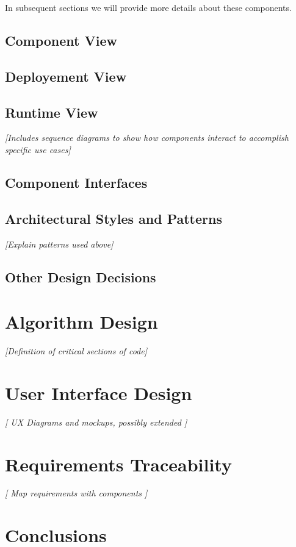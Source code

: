\documentclass[11pt]{article} %
\begin{document}
In subsequent sections we will provide more details about these components.

\subsection{Component View}

\subsection{Deployement View}

\subsection{Runtime View}
	\textit{ [Includes sequence diagrams to show how components interact to accomplish specific use cases]}

\subsection{Component Interfaces}

\subsection{Architectural Styles and Patterns}
	\textit{ [Explain patterns used above]}

\subsection{Other Design Decisions}


\newpage
\section{Algorithm Design}
	\textit{ [Definition of critical sections of code] }


\newpage
\section{User Interface Design}
	\textit{ [ UX Diagrams and mockups, possibly extended ] }


\newpage
\section{Requirements Traceability}
	\textit{[ Map requirements with components ]  }


\newpage
\section{Conclusions}
\end{document}
